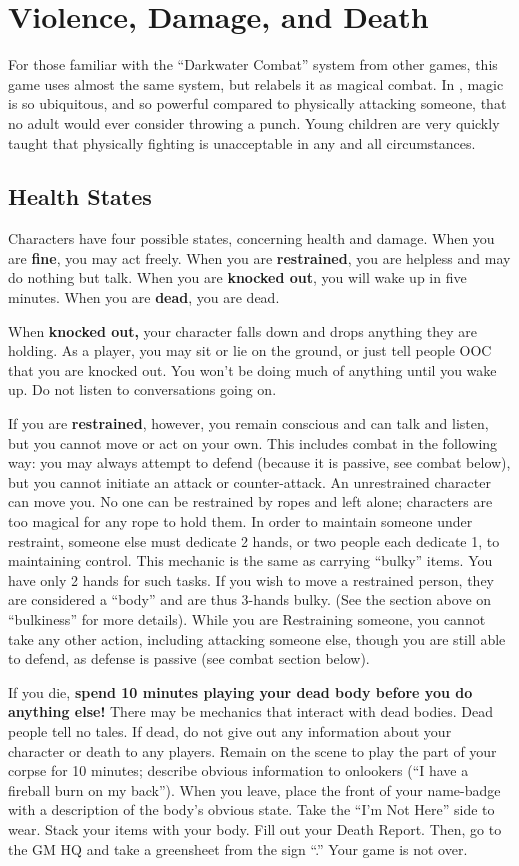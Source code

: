\documentclass[sheet]{GL2020}
\begin{document}
\section{Violence, Damage, and Death}
For those familiar with the ``Darkwater Combat'' system from other games, this game uses almost the same system, but relabels it as magical combat. In \pEarth{}, magic is so ubiquitous, and so powerful compared to physically attacking someone, that no adult would ever consider throwing a punch. Young children are very quickly taught that physically fighting is unacceptable in any and all circumstances.

\subsection{Health States}

Characters have four possible states, concerning health and damage. When you are {\bf fine}, you may act freely. When you are {\bf restrained}, you are helpless and may do nothing but talk. When you are {\bf knocked out}, you will wake up in five minutes. When you are {\bf dead}, you are dead.

When \textbf{knocked out,} your character falls down and drops anything they are holding. As a player, you may sit or lie on the ground, or just tell people OOC that you are knocked out. You won't be doing much of anything until you wake up. Do not listen to conversations going on. 

If you are \textbf{restrained}, however, you remain conscious and can talk and listen, but you cannot move or act on your own. This includes combat in the following way: you may always attempt to defend (because it is passive, see combat below), but you cannot initiate an attack or counter-attack. An unrestrained character can move you. No one can be restrained by ropes and left alone; characters are too magical for any rope to hold them. In order to maintain someone under restraint, someone else must dedicate 2 hands, or two people each dedicate 1, to maintaining control. This mechanic is the same as carrying ``bulky'' items. You have only 2 hands for such tasks. If you wish to move a restrained person, they are considered a ``body'' and are thus 3-hands bulky. (See the section above on ``bulkiness'' for more details). While you are Restraining someone, you cannot take any other action, including attacking someone else, though you are still able to defend, as defense is passive (see combat section below).

If you die, \textbf{spend 10 minutes playing your dead body before you do anything else!} There may be mechanics that interact with dead bodies. Dead people tell no tales. If dead, do not give out any information about your character or death to any players. Remain on the scene to play the part of your corpse for 10 minutes; describe obvious information to onlookers (``I have a fireball burn on my back''). When you leave, place the front of your name-badge with a description of the body's obvious state. Take the ``I'm Not Here'' side to wear. Stack your items with your body. Fill out your Death Report. Then, go to the GM HQ and take a greensheet from the sign ``\sMurdered{}.'' Your game is not over. 
\end{document}
